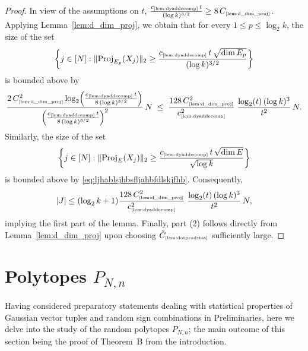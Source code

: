 \documentclass[11pt]{amsart}
\theoremstyle{definition}
\theoremstyle{plain}
\def\Proj{{\rm Proj}}
\newcommand{\tref}[1]{\text{\tiny{\ref{#1}}}}
\begin{document}
\begin{proof}
In view of the assumptions on $t$,
$\frac{c_{\tref{lem:dyaddecomp}} \, t}{(\log k)^{3/2}}
\geq 8\,C_{\tref{lem:d_dim_proj}}$.
Applying Lemma~\ref{lem:d_dim_proj}, we obtain that 
for every $1\leq p\leq \log_2 k$,
the size
of the set
\[
  \bigg\{
    j \in [N] :
    \|\Proj_{E_p}(X_j)\|_2
    \ge
    \frac{c_{\tref{lem:dyaddecomp}} \, t \, \sqrt{\dim E_p}}
    {(\log k)^{3/2}}
  \bigg\}
\]
is bounded above by
\begin{equation}\label{eq:ljhablsjhbsfljahbfdlskjfhb}
  \frac{
    2\,C_{\tref{lem:d_dim_proj}}^2
    \log_2\!\left(
      \frac{c_{\tref{lem:dyaddecomp}} \, t}{8\,(\log k)^{3/2}}
    \right)
  }{
    \left(
      \frac{c_{\tref{lem:dyaddecomp}} \, t}{8\,(\log k)^{3/2}}
    \right)^2
  }\,
  N
  \;\le\;
  \frac{128\,C_{\tref{lem:d_dim_proj}}^2}{c_{\tref{lem:dyaddecomp}}^2}\;
  \frac{
    \log_2(t) \, (\log k)^3
  }{t^2}
  \,N.
\end{equation}
Similarly, the size
of the set
\[
  \bigg\{
    j \in [N] :
    \|\Proj_E(X_j)\|_2
    \ge
    \dfrac{c_{\tref{lem:dyaddecomp}} \, t \, \sqrt{\dim E}}
    {\sqrt{\log k}}
  \bigg\}
\]
is bounded above by \eqref{eq:ljhablsjhbsfljahbfdlskjfhb}.
Consequently,
\[
  |J|
  \le (\log_2 k + 1) \frac{128\,C_{\tref{lem:d_dim_proj}}^2}{c_{\tref{lem:dyaddecomp}}^2}\;
  \frac{
    \log_2(t) \, (\log k)^3
  }{t^2}
  \,N,
\]
implying the first part of the lemma.
Finally, part (2) follows directly from Lemma~\ref{lem:d_dim_proj} upon choosing $\tilde{C}_{\tref{lem:dotprodstat}}$ sufficiently large.
\end{proof}










\section{Polytopes $P_{N,n}$}

Having considered preparatory statements dealing with statistical properties
of Gaussian vector tuples and random sign combinations in Preliminaries,
here we delve into the study of the random polytopes $P_{N,n}$;
the main outcome of this section being the proof of Theorem~B from the introduction.
\end{document}
